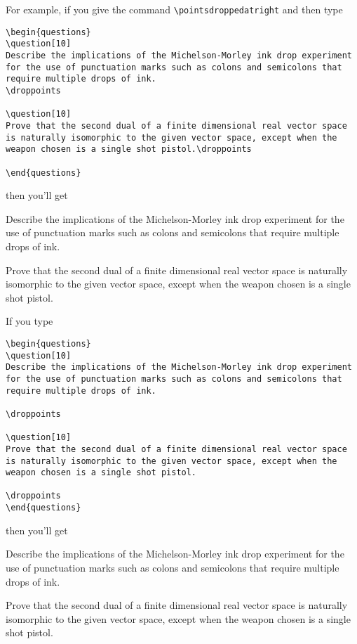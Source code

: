 \documentclass[12pt]{exam}
\begin{document}
For example, if you give the command \verb"\pointsdroppedatright" and
then type
\begin{verbatim}
\begin{questions}
\question[10]
Describe the implications of the Michelson-Morley ink drop experiment
for the use of punctuation marks such as colons and semicolons that
require multiple drops of ink.
\droppoints

\question[10]
Prove that the second dual of a finite dimensional real vector space
is naturally isomorphic to the given vector space, except when the
weapon chosen is a single shot pistol.\droppoints

\end{questions}
\end{verbatim}
then you'll get
\pointsdroppedatright
\begin{questions}
\question[10]
Describe the implications of the Michelson-Morley ink drop experiment
for the use of punctuation marks such as colons and semicolons that
require multiple drops of ink.
\droppoints

\question[10]
Prove that the second dual of a finite dimensional real vector space
is naturally isomorphic to the given vector space, except when the
weapon chosen is a single shot pistol.\droppoints

\end{questions}

If you type
\begin{verbatim}
\begin{questions}
\question[10]
Describe the implications of the Michelson-Morley ink drop experiment
for the use of punctuation marks such as colons and semicolons that
require multiple drops of ink.

\droppoints

\question[10]
Prove that the second dual of a finite dimensional real vector space
is naturally isomorphic to the given vector space, except when the
weapon chosen is a single shot pistol.

\droppoints
\end{questions}
\end{verbatim}
then you'll get
\begin{questions}
\question[10]
Describe the implications of the Michelson-Morley ink drop experiment
for the use of punctuation marks such as colons and semicolons that
require multiple drops of ink.

\droppoints

\question[10]
Prove that the second dual of a finite dimensional real vector space
is naturally isomorphic to the given vector space, except when the
weapon chosen is a single shot pistol.

\droppoints
\end{questions}
\nopointsinmargin
\end{document}
